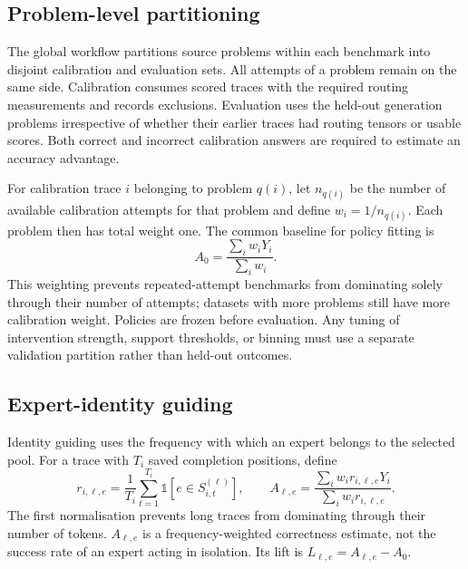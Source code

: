 \documentclass[12pt,a4paper,twoside,openright]{book}
\begin{document}
\subsection{Problem-level partitioning}

The global workflow partitions source problems within each benchmark into
disjoint calibration and evaluation sets. All attempts of a problem
remain on the same side. Calibration consumes scored traces with the
required routing measurements and records exclusions. Evaluation uses the
held-out generation problems irrespective of whether their earlier traces
had routing tensors or usable scores. Both correct and incorrect calibration
answers are required to estimate an accuracy advantage.

For calibration trace $i$ belonging to problem $q(i)$, let $n_{q(i)}$ be the
number of available calibration attempts for that problem and define
$w_i=1/n_{q(i)}$. Each problem then has total weight one. The common baseline
for policy fitting is
\begin{equation}
  A_0=\frac{\sum_i w_iY_i}{\sum_i w_i}.
  \label{eq:method-calibration-accuracy}
\end{equation}
This weighting prevents repeated-attempt benchmarks from dominating solely
through their number of attempts; datasets with more problems still have
more calibration weight. Policies are frozen before evaluation. Any tuning
of intervention strength, support thresholds, or binning must use a separate
validation partition rather than held-out outcomes.

\subsection{Expert-identity guiding}
\label{sec:method-identity}

Identity guiding uses the frequency with which an expert belongs to the
selected pool. For a trace with $T_i$ saved completion positions, define
\begin{equation}
  r_{i,\ell,e}=\frac{1}{T_i}\sum_{t=1}^{T_i}
  \mathds{1}\!\left[e\in S_{i,t}^{(\ell)}\right],
  \qquad
  A_{\ell,e}=
  \frac{\sum_i w_i r_{i,\ell,e}Y_i}{\sum_i w_i r_{i,\ell,e}}.
\end{equation}
The first normalisation prevents long traces from dominating through their
number of tokens. $A_{\ell,e}$ is a frequency-weighted correctness estimate,
not the success rate of an expert acting in isolation. Its lift is
$L_{\ell,e}=A_{\ell,e}-A_0$.
\end{document}
